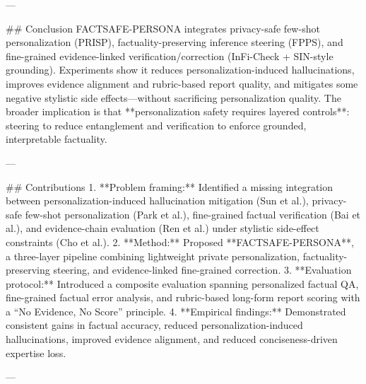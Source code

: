 ---

## Conclusion  
FACTSAFE-PERSONA integrates privacy-safe few-shot personalization (PRISP), factuality-preserving inference steering (FPPS), and fine-grained evidence-linked verification/correction (InFi-Check + SIN-style grounding). Experiments show it reduces personalization-induced hallucinations, improves evidence alignment and rubric-based report quality, and mitigates some negative stylistic side effects—without sacrificing personalization quality. The broader implication is that **personalization safety requires layered controls**: steering to reduce entanglement and verification to enforce grounded, interpretable factuality.

---

## Contributions  
1. **Problem framing:** Identified a missing integration between personalization-induced hallucination mitigation (Sun et al.), privacy-safe few-shot personalization (Park et al.), fine-grained factual verification (Bai et al.), and evidence-chain evaluation (Ren et al.) under stylistic side-effect constraints (Cho et al.).  
2. **Method:** Proposed **FACTSAFE-PERSONA**, a three-layer pipeline combining lightweight private personalization, factuality-preserving steering, and evidence-linked fine-grained correction.  
3. **Evaluation protocol:** Introduced a composite evaluation spanning personalized factual QA, fine-grained factual error analysis, and rubric-based long-form report scoring with a “No Evidence, No Score” principle.  
4. **Empirical findings:** Demonstrated consistent gains in factual accuracy, reduced personalization-induced hallucinations, improved evidence alignment, and reduced conciseness-driven expertise loss.

---